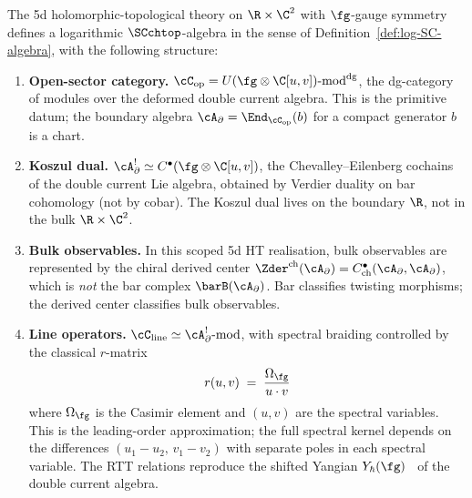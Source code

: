 \begin{theorem}
\label{thm:DDCA-swiss-cheese}
The 5d holomorphic-topological theory on
$\R \times \C^2$ with $\fg$-gauge symmetry defines a
logarithmic $\SCchtop$-algebra in the sense of
Definition~\textup{\ref{def:log-SC-algebra}}, with the
following structure:
\begin{enumerate}[label=\textup{(\roman*)},nosep]
\item \textbf{Open-sector category.}
 $\cC_{\mathrm{op}} =
 U(\fg\otimes\C[u,v])\text{-}\mathrm{mod}^{\mathrm{dg}}$,
 the dg-category of modules over the deformed double
 current algebra. This is the primitive datum;
 the boundary algebra
 $\cA_\partial = \End_{\cC_{\mathrm{op}}}(b)$ for a
 compact generator $b$ is a chart.
\item \textbf{Koszul dual.}
 $\cA^!_\partial \simeq
 C^\bullet(\fg\otimes\C[u,v])$,
 the Chevalley--Eilenberg cochains of the double
 current Lie algebra, obtained by Verdier duality on bar
 cohomology \textup{(}not by cobar\textup{)}. The Koszul
 dual lives on the boundary $\R$, not in the
 bulk $\R \times \C^2$.
\item \textbf{Bulk observables.}
 In this scoped 5d HT realisation, bulk observables are represented by
 the chiral derived center
 $\Zder^{\mathrm{ch}}(\cA_\partial)
 = C^\bullet_{\mathrm{ch}}(\cA_\partial, \cA_\partial)$,
 which is \emph{not} the bar complex $\barB(\cA_\partial)$.
 Bar classifies twisting morphisms; the derived center
 classifies bulk observables.
\item \textbf{Line operators.}
 $\cC_{\mathrm{line}} \simeq
 \cA^!_\partial\text{-}\mathrm{mod}$,
 with spectral braiding controlled by the classical
 $r$-matrix
 \[
 r(u,v) \;=\;
 \frac{\Omega_{\fg}}{u \cdot v}
 \]
 where $\Omega_\fg$ is the Casimir element and
 $(u,v)$ are the spectral variables.
 This is the leading-order approximation; the full
 spectral kernel depends on the differences
 $(u_1 - u_2,\, v_1 - v_2)$ with separate poles in
 each spectral variable.
 The RTT relations reproduce the shifted Yangian
 $Y_\hbar(\fg)$~\cite{DNP2025} of the double
 current algebra.
\end{enumerate}
\end{theorem}


